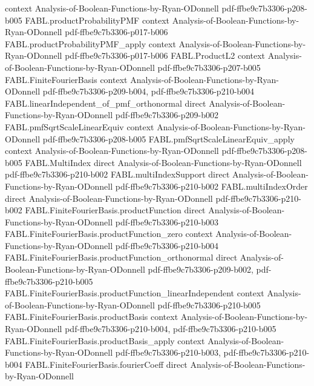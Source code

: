 \begin{theorem}
  {context}
  {Analysis-of-Boolean-Functions-by-Ryan-ODonnell}
  {pdf-ffbe9c7b3306-p208-b005}
\proofstep
  {FABL.productProbabilityPMF}
  {context}
  {Analysis-of-Boolean-Functions-by-Ryan-ODonnell}
  {pdf-ffbe9c7b3306-p017-b006}
\proofstep
  {FABL.productProbabilityPMF_apply}
  {context}
  {Analysis-of-Boolean-Functions-by-Ryan-ODonnell}
  {pdf-ffbe9c7b3306-p017-b006}
\proofstep
  {FABL.ProductL2}
  {context}
  {Analysis-of-Boolean-Functions-by-Ryan-ODonnell}
  {pdf-ffbe9c7b3306-p207-b005}
\proofstep
  {FABL.FiniteFourierBasis}
  {context}
  {Analysis-of-Boolean-Functions-by-Ryan-ODonnell}
  {pdf-ffbe9c7b3306-p209-b004,
    pdf-ffbe9c7b3306-p210-b004}
\proofstep
  {FABL.linearIndependent_of_pmf_orthonormal}
  {direct}
  {Analysis-of-Boolean-Functions-by-Ryan-ODonnell}
  {pdf-ffbe9c7b3306-p209-b002}
\proofstep
  {FABL.pmfSqrtScaleLinearEquiv}
  {context}
  {Analysis-of-Boolean-Functions-by-Ryan-ODonnell}
  {pdf-ffbe9c7b3306-p208-b005}
\proofstep
  {FABL.pmfSqrtScaleLinearEquiv_apply}
  {context}
  {Analysis-of-Boolean-Functions-by-Ryan-ODonnell}
  {pdf-ffbe9c7b3306-p208-b005}
\proofstep
  {FABL.MultiIndex}
  {direct}
  {Analysis-of-Boolean-Functions-by-Ryan-ODonnell}
  {pdf-ffbe9c7b3306-p210-b002}
\proofstep
  {FABL.multiIndexSupport}
  {direct}
  {Analysis-of-Boolean-Functions-by-Ryan-ODonnell}
  {pdf-ffbe9c7b3306-p210-b002}
\proofstep
  {FABL.multiIndexOrder}
  {direct}
  {Analysis-of-Boolean-Functions-by-Ryan-ODonnell}
  {pdf-ffbe9c7b3306-p210-b002}
\proofstep
  {FABL.FiniteFourierBasis.productFunction}
  {direct}
  {Analysis-of-Boolean-Functions-by-Ryan-ODonnell}
  {pdf-ffbe9c7b3306-p210-b003}
\proofstep
  {FABL.FiniteFourierBasis.productFunction_zero}
  {context}
  {Analysis-of-Boolean-Functions-by-Ryan-ODonnell}
  {pdf-ffbe9c7b3306-p210-b004}
\proofstep
  {FABL.FiniteFourierBasis.productFunction_orthonormal}
  {direct}
  {Analysis-of-Boolean-Functions-by-Ryan-ODonnell}
  {pdf-ffbe9c7b3306-p209-b002,
    pdf-ffbe9c7b3306-p210-b005}
\proofstep
  {FABL.FiniteFourierBasis.productFunction_linearIndependent}
  {context}
  {Analysis-of-Boolean-Functions-by-Ryan-ODonnell}
  {pdf-ffbe9c7b3306-p210-b005}
\proofstep
  {FABL.FiniteFourierBasis.productBasis}
  {context}
  {Analysis-of-Boolean-Functions-by-Ryan-ODonnell}
  {pdf-ffbe9c7b3306-p210-b004,
    pdf-ffbe9c7b3306-p210-b005}
\proofstep
  {FABL.FiniteFourierBasis.productBasis_apply}
  {context}
  {Analysis-of-Boolean-Functions-by-Ryan-ODonnell}
  {pdf-ffbe9c7b3306-p210-b003,
    pdf-ffbe9c7b3306-p210-b004}
\proofstep
  {FABL.FiniteFourierBasis.fourierCoeff}
  {direct}
  {Analysis-of-Boolean-Functions-by-Ryan-ODonnell}

\end{theorem}
